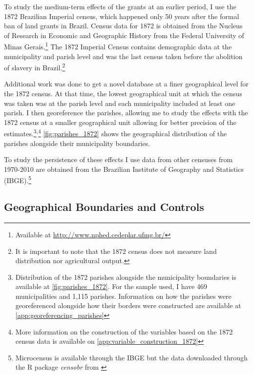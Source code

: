\documentclass{article}
\begin{document}
To study the medium-term effects of the grants at an earlier period, I use the 1872 Brazilian Imperial census, which happened only 50 years after the formal ban of land grants in Brazil.
Census data for 1872 is obtained from the Nucleus of Research in Economic and Geographic History from the Federal University of Minas Gerais.\footnote{
  Available at \url{http://www.nphed.cedeplar.ufmg.br/}}
The 1872 Imperial Census contains demographic data at the municipality and parish level and was the last census taken before the abolition of slavery in Brazil.\footnote{It is important to note that the 1872 census does not measure land distribution nor agricultural output.}

Additional work was done to get a novel database at a finer geographical level for the 1872 census.
At that time, the lowest geographical unit at which the census was taken was at the parish level and each municipality included at least one parish.
I then georeference the parishes, allowing me to study the effects with the 1872 census at a smaller geographical unit allowing for better precision of the estimates.\footnote{Distribution of the 1872 parishes alongside the municipality boundaries is available at \autoref{fig:parishes_1872}. For the sample used, I have 469 municipalities and 1,115 parishes. Information on how the parishes were georeferenced alongside how their borders were constructed are available at \autoref{app:georeferencing_parishes}}\textsuperscript{,}\footnote{More information on the construction of the variables based on the 1872 census data is available on \autoref{app:variable_construction_1872}} 
\autoref{fig:parishes_1872} shows the geographical distribution of the parishes alongside their municipality boundaries. 

To study the persistence of these effects I use data from other censuses from 1970-2010 are obtained from the Brazilian Institute of Geography and Statistics (IBGE).\footnote{Microcensus is available through the IBGE but the data downloaded through the R package \textit{censobr} from \textcite{Pereira2023-qv}}

\subsection{Geographical Boundaries and Controls}
\end{document}
